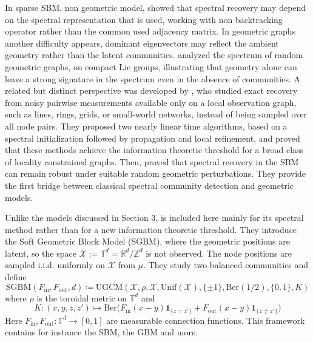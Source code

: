 \documentclass[runningheads]{llncs}
\begin{document}
In sparse SBM, non geometric model, \citep{bordenave2015non} showed that spectral recovery may depend on the spectral representation that is used, working with non backtracking operator rather than the common used adjacency matrix. In geometric graphs another difficulty appears, dominant eigenvectors may reflect the ambient geometry rather than the latent communities.
\citep{meliot2019asymptotic} analyzed the spectrum of random geometric graphs, on compact Lie groups, illustrating that geometry alone can leave a strong signature in the spectrum even in the absence of communities.
A related but distinct perspective was developed by \citep{chen2016community}, who studied exact recovery from noisy pairwise measurements available only on a local observation graph, such as lines, rings, grids, or small-world networks, instead of being sampled over all node pairs. They proposed two nearly linear time algorithms, based on a spectral initialization followed by propagation and local refinement, and proved that these methods achieve the information theoretic threshold for a broad class of locality constrained graphs.
Then, \citep{peche2020robustness} proved that spectral recovery in the SBM can remain robust under suitable random geometric perturbations. They provide the first bridge between classical spectral community detection and geometric models.


Unlike the models discussed in Section 3, \citep{avrachenkov2021higher} is included here mainly for its spectral method rather than for a new information theoretic threshold. They introduce the Soft Geometric Block Model (SGBM), where the geometric positions are latent, so the space \(\mathcal X := \mathbb T^d = \mathbb R^d/\mathbb Z^d\) is not observed. The node positions are sampled i.i.d. uniformly on \(\mathcal X\) from \(\mu\). They study two balanced communities and define
\[
\mathrm{SGBM}(F_{\mathrm{in}},F_{\mathrm{out}},d)
\coloneqq
\mathrm{UGCM}\!\left(
\mathcal X,\rho,\mathcal X,\mathrm{Unif}(\mathcal X),\{\pm1\},\mathrm{Ber}(1/2),\{0,1\},K
\right)
\]
where \(\rho\) is the toroidal metric on \(\mathbb T^d\) and
\[
K : (x,y,z,z')
\longmapsto
\mathrm{Ber}\!\Big(
F_{\mathrm{in}}(x-y)\mathbf 1_{\{z=z'\}}
+
F_{\mathrm{out}}(x-y)\mathbf 1_{\{z\neq z'\}}
\Big)
\]
Here \(F_{\mathrm{in}},F_{\mathrm{out}}:\mathbb T^d\to[0,1]\) are measurable connection functions. This framework contains for instance the SBM, the GBM and more. 
\end{document}
